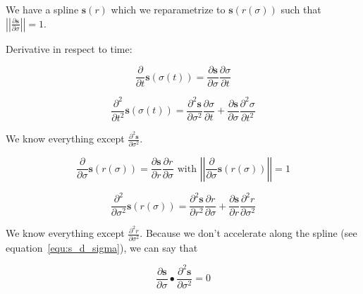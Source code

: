 \documentclass[11pt,onecolumn,a4paper,oneside,openright,final]{article}
\begin{document}
We have a spline $\mathbf{s}\left( r \right)$ which we reparametrize to $\mathbf{s}\left( r \left( \sigma \right) \right)$ such that $\left| \left| \frac{\partial \mathbf{s}}{\partial \sigma} \right| \right| = 1$.

Derivative in respect to time:

\begin{equation}
    \frac{\partial}{\partial t} \mathbf{s} \left( \sigma \left( t \right) \right) =
    \frac{\partial \mathbf{s}}{\partial \sigma} \frac{\partial \sigma}{\partial t} 
    \label{equ:s_dot}
\end{equation}

\begin{equation}
    \frac{\partial^2}{\partial t^2} \mathbf{s} \left( \sigma \left( t \right) \right) =
    \frac{\partial^2 \mathbf{s}}{\partial \sigma^2} \frac{\partial \sigma}{\partial t} +
    \frac{\partial \mathbf{s}}{\partial \sigma} \frac{\partial^2 \sigma}{\partial t^2} 
    \label{equ:s_dot_dot}
\end{equation}

We know everything except $\frac{\partial^2 \mathbf{s}}{\partial \sigma^2}$.

\begin{equation}
    \frac{\partial}{\partial \sigma} \mathbf{s} \left( r \left( \sigma \right) \right) =
    \frac{\partial \mathbf{s}}{\partial r} \frac{\partial r}{\partial \sigma}
    \textrm{ with }
    \left| \left| \frac{\partial}{\partial \sigma} \mathbf{s} \left( r \left( \sigma \right) \right) \right| \right| = 1
    \label{equ:s_d_sigma}
\end{equation}

\begin{equation}
    \frac{\partial^2}{\partial \sigma^2} \mathbf{s} \left( r \left( \sigma \right) \right) =
    \frac{\partial^2 \mathbf{s}}{\partial r^2} \frac{\partial r}{\partial \sigma} +
    \frac{\partial \mathbf{s}}{\partial r} \frac{\partial^2 r}{\partial \sigma^2} 
    \label{equ:s_dd_sigma}
\end{equation}

We know everything except $\frac{\partial^2 r}{\partial \sigma^2}$. Because we don't accelerate along the spline (see equation~\ref{equ:s_d_sigma}), we can say that

\begin{equation}
    \frac{\partial \mathbf{s}}{\partial \sigma} \bullet \frac{\partial^2 \mathbf{s}}{\partial \sigma^2} = 0
    \label{equ:perpendicular}
\end{equation}
\end{document}
